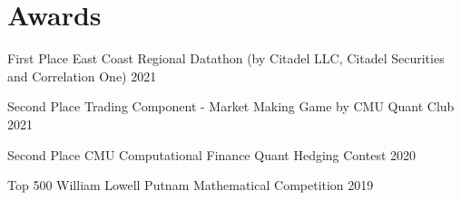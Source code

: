 \section{Awards}
\resumeSectionStart

\awardsTableStart

    \awardsItem
        {First Place}
        {East Coast Regional Datathon (by Citadel LLC, Citadel Securities and Correlation One)}
        {2021}

    \awardsItem
        {Second Place}
        {Trading Component - Market Making Game by CMU Quant Club}
        {2021}

    \awardsItem
        {Second Place}
        {CMU Computational Finance Quant Hedging Contest}
        {2020}

    \awardsItem
        {Top 500}
        {William Lowell Putnam Mathematical Competition}
        {2019}

\awardsTableEnd

\resumeSectionEnd